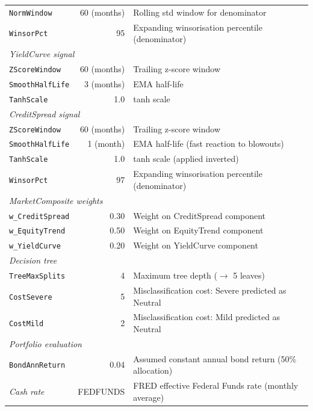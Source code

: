 \documentclass[11pt, a4paper]{article}
\begin{document}
\begin{longtable}{p{4.5cm} r p{7.5cm}}
\texttt{NormWindow}         & 60 (months) & Rolling std window for denominator \\
\texttt{WinsorPct}          & 95 & Expanding winsorisation percentile (denominator) \\
\midrule
\multicolumn{3}{l}{\textit{YieldCurve signal}} \\
\texttt{ZScoreWindow}       & 60 (months) & Trailing z-score window \\
\texttt{SmoothHalfLife}     & 3 (months) & EMA half-life \\
\texttt{TanhScale}          & 1.0 & tanh scale \\
\midrule
\multicolumn{3}{l}{\textit{CreditSpread signal}} \\
\texttt{ZScoreWindow}       & 60 (months) & Trailing z-score window \\
\texttt{SmoothHalfLife}     & 1 (month) & EMA half-life (fast reaction to blowouts) \\
\texttt{TanhScale}          & 1.0 & tanh scale (applied inverted) \\
\texttt{WinsorPct}          & 97 & Expanding winsorisation percentile (denominator) \\
\midrule
\multicolumn{3}{l}{\textit{MarketComposite weights}} \\
\texttt{w\_CreditSpread}    & 0.30 & Weight on CreditSpread component \\
\texttt{w\_EquityTrend}     & 0.50 & Weight on EquityTrend component \\
\texttt{w\_YieldCurve}      & 0.20 & Weight on YieldCurve component \\
\midrule
\multicolumn{3}{l}{\textit{Decision tree}} \\
\texttt{TreeMaxSplits}      & 4 & Maximum tree depth ($\to$ 5 leaves) \\
\texttt{CostSevere}         & 5 & Misclassification cost: Severe predicted as Neutral \\
\texttt{CostMild}           & 2 & Misclassification cost: Mild predicted as Neutral \\
\midrule
\multicolumn{3}{l}{\textit{Portfolio evaluation}} \\
\texttt{BondAnnReturn}      & 0.04 & Assumed constant annual bond return (50\% allocation) \\
\textit{Cash rate}          & FEDFUNDS & FRED effective Federal Funds rate (monthly average) \\

\end{longtable}
\end{document}
